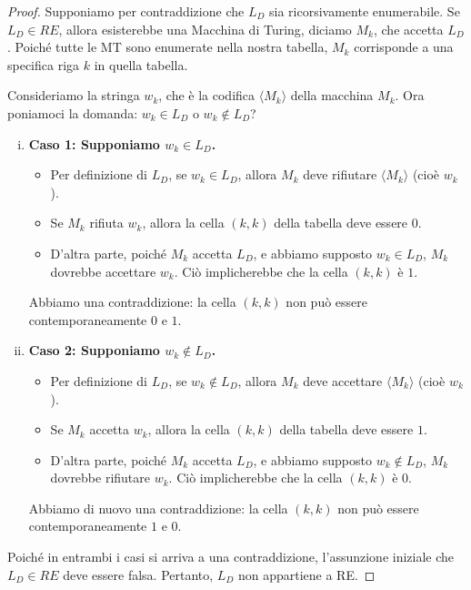 \documentclass[a4paper]{article}
\begin{document}
\begin{proof}
Supponiamo per contraddizione che $L_D$ sia ricorsivamente enumerabile. Se $L_D \in RE$, allora esisterebbe una Macchina di Turing, diciamo $M_k$, che accetta $L_D$. Poiché tutte le MT sono enumerate nella nostra tabella, $M_k$ corrisponde a una specifica riga $k$ in quella tabella.

Consideriamo la stringa $w_k$, che è la codifica $\langle M_k \rangle$ della macchina $M_k$.
Ora poniamoci la domanda: $w_k \in L_D$ o $w_k \notin L_D$?

\begin{enumerate}[(i)]
    \item \textbf{Caso 1: Supponiamo $w_k \in L_D$.}
    \begin{itemize}
        \item Per definizione di $L_D$, se $w_k \in L_D$, allora $M_k$ deve rifiutare $\langle M_k \rangle$ (cioè $w_k$).
        \item Se $M_k$ rifiuta $w_k$, allora la cella $(k,k)$ della tabella deve essere $0$.
        \item D'altra parte, poiché $M_k$ accetta $L_D$, e abbiamo supposto $w_k \in L_D$, $M_k$ dovrebbe accettare $w_k$. Ciò implicherebbe che la cella $(k,k)$ è $1$.
    \end{itemize}
    Abbiamo una contraddizione: la cella $(k,k)$ non può essere contemporaneamente $0$ e $1$.

    \item \textbf{Caso 2: Supponiamo $w_k \notin L_D$.}
    \begin{itemize}
        \item Per definizione di $L_D$, se $w_k \notin L_D$, allora $M_k$ deve accettare $\langle M_k \rangle$ (cioè $w_k$).
        \item Se $M_k$ accetta $w_k$, allora la cella $(k,k)$ della tabella deve essere $1$.
        \item D'altra parte, poiché $M_k$ accetta $L_D$, e abbiamo supposto $w_k \notin L_D$, $M_k$ dovrebbe rifiutare $w_k$. Ciò implicherebbe che la cella $(k,k)$ è $0$.
    \end{itemize}
    Abbiamo di nuovo una contraddizione: la cella $(k,k)$ non può essere contemporaneamente $1$ e $0$.
\end{enumerate}
Poiché in entrambi i casi si arriva a una contraddizione, l'assunzione iniziale che $L_D \in RE$ deve essere falsa. Pertanto, $L_D$ non appartiene a RE.
\end{proof}
\end{document}
